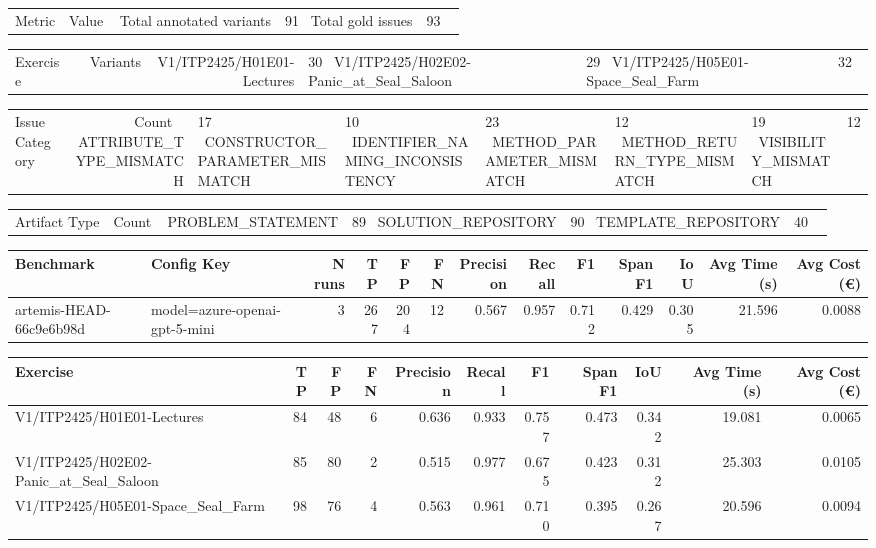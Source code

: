 \begin{tabular}{lr}
Metric & Value \
\hline
Total annotated variants & 91 \
Total gold issues & 93 \
\end{tabular}

\begin{tabular}{lr}
Exercise & Variants \
\hline
V1/ITP2425/H01E01-Lectures & 30 \
V1/ITP2425/H02E02-Panic\_at\_Seal\_Saloon & 29 \
V1/ITP2425/H05E01-Space\_Seal\_Farm & 32 \
\end{tabular}

\begin{tabular}{lr}
Issue Category & Count \
\hline
ATTRIBUTE\_TYPE\_MISMATCH & 17 \
CONSTRUCTOR\_PARAMETER\_MISMATCH & 10 \
IDENTIFIER\_NAMING\_INCONSISTENCY & 23 \
METHOD\_PARAMETER\_MISMATCH & 12 \
METHOD\_RETURN\_TYPE\_MISMATCH & 19 \
VISIBILITY\_MISMATCH & 12 \
\end{tabular}

\begin{tabular}{lr}
Artifact Type & Count \
\hline
PROBLEM\_STATEMENT & 89 \
SOLUTION\_REPOSITORY & 90 \
TEMPLATE\_REPOSITORY & 40 \
\end{tabular}

\begin{tabular}{llrrrrrrrrrrr}
Benchmark & Config Key & N runs & TP & FP & FN & Precision & Recall & F1 & Span F1 & IoU & Avg Time (s) & Avg Cost (€) \\
\hline
artemis-HEAD-66c9e6b98d & model=azure-openai-gpt-5-mini & 3 & 267 & 204 & 12 & 0.567 & 0.957 & 0.712 & 0.429 & 0.305 & 21.596 & 0.0088 \\
\end{tabular}

\begin{tabular}{lrrrrrrrrrr}
Exercise & TP & FP & FN & Precision & Recall & F1 & Span F1 & IoU & Avg Time (s) & Avg Cost (€) \\
\hline
V1/ITP2425/H01E01-Lectures & 84 & 48 & 6 & 0.636 & 0.933 & 0.757 & 0.473 & 0.342 & 19.081 & 0.0065 \\
V1/ITP2425/H02E02-Panic\_at\_Seal\_Saloon & 85 & 80 & 2 & 0.515 & 0.977 & 0.675 & 0.423 & 0.312 & 25.303 & 0.0105 \\
V1/ITP2425/H05E01-Space\_Seal\_Farm & 98 & 76 & 4 & 0.563 & 0.961 & 0.710 & 0.395 & 0.267 & 20.596 & 0.0094 \\
\end{tabular}
